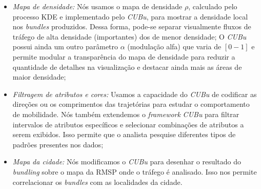 \begin{itemize}
\item\emph{Mapa de densidade:} Nós usamos o mapa de densidade $\rho$,
calculado pelo processo KDE e implementado pelo \emph{CUBu}, para mostrar a densidade
local nos \emph{bundles} produzidos. Dessa forma, pode-se separar visualmente
fluxos de tráfego de alta densidade (importantes) dos de menor densidade; O \emph{CUBu}
possui ainda um outro parâmetro $\alpha$ (modulação alfa) que varia de $[0 - 1]$
e permite modular a transparência do mapa de densidade para reduzir a quantidade de detalhes
na visualização e destacar ainda mais as áreas de maior densidade;
 
\item\emph{Filtragem de atributos e cores:} Usamos a capacidade do \emph{CUBu} de
codificar as direções ou os comprimentos das trajetórias para
estudar o comportamento de mobilidade. Nós também extendemos o \emph{framework} \emph{CUBu}
para filtrar intervalos de atributos específicos e selecionar combinações de atributos a
serem exibidos. Isso permite que o analista pesquise diferentes tipos de padrões
presentes nos dados;

\item\emph{Mapa da cidade:} Nós modificamos o \emph{CUBu} para desenhar
o resultado do \emph{bundling} sobre o mapa da RMSP onde o tráfego é analisado. Isso nos permite
correlacionar os \emph{bundles} com as localidades da cidade.
\end{itemize}

